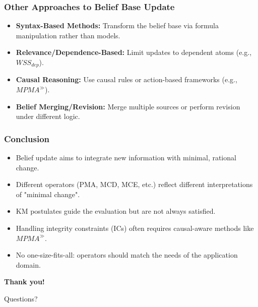 \documentclass{beamer}
\begin{document}
\begin{frame}
\frametitle{Other Approaches to Belief Base Update}
\begin{itemize}
\item \textbf{Syntax-Based Methods:} Transform the belief base via formula manipulation rather than models.
\item \textbf{Relevance/Dependence-Based:} Limit updates to dependent atoms (e.g., $WSS_{dep}$).
\item \textbf{Causal Reasoning:} Use causal rules or action-based frameworks (e.g., $MPMA^{\gg}$).
\item \textbf{Belief Merging/Revision:} Merge multiple sources or perform revision under different logic.
\end{itemize}
\end{frame}


\begin{frame}
\frametitle{Conclusion}
\begin{itemize}
\item Belief update aims to integrate new information with minimal, rational change.
\item Different operators (PMA, MCD, MCE, etc.) reflect different interpretations of "minimal change".
\item KM postulates guide the evaluation but are not always satisfied.
\item Handling integrity constraints (ICs) often requires causal-aware methods like $MPMA^{\gg}$.
\item No one-size-fits-all: operators should match the needs of the application domain.
\end{itemize}
\end{frame}



\begin{frame}[c]
\centering
\Huge
\textbf{Thank you!}

\vspace{1cm}

\LARGE
Questions?
\end{frame}
\end{document}
